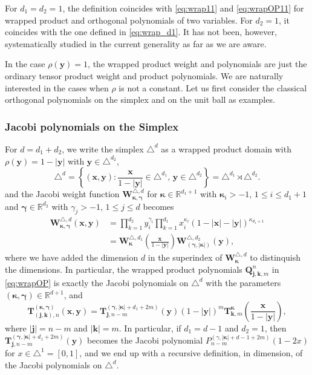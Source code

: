\documentclass{amsart}
\theoremstyle{remark}
\def\g{{\gamma}}
\def\k{{\kappa}}
\def\jb{{\bm j}}
\def\kb{{\bm k}}
\def\xb{{\bm x}}
\def\yb{{\bm y}}
\def\Qb{{\bm Q}}
\def\Tb{{\bm T}}
\def\Wb{{\bm W}}
\def\RR{{\mathbb R}}
\def\bg{{\boldsymbol{\gamma}}}
\def\bk{{\boldsymbol{\kappa}}}
\begin{document}
For $d_1 = d_2 = 1$, the definition coincides with \eqref{eq:wrap11} and \eqref{eq:wrapOP11} for wrapped product
and orthogonal polynomials of two variables. For $d_2 =1$, it coincides with the one defined in \eqref{eq:wrap_d1}. 
It has not been, however, systematically studied in the current generality as far as we are aware. 

In the case $\rho(\yb) = 1$, the wrapped product weight and polynomials are just the ordinary tensor product 
weight and product polynomials. We are naturally interested in the cases when $\rho$ is not a constant. 
Let us first consider the classical orthogonal polynomials on the simplex and on the unit ball as examples. 

\subsubsection{Jacobi polynomials on the Simplex} For $d = d_1+d_2$, we write the simplex $\triangle^{d}$ as a wrapped product 
domain with $\rho(\yb) = 1- |\yb|$ with $\yb \in \triangle^{d_2}$, 
$$
   \triangle^{d} = \left\{(\xb,\yb):   \frac{\xb}{1-|\yb|} \in \triangle^{d_1}, \, \yb \in \triangle^{d_2} \right\} 
      = \triangle^{d_1} \rtimes \triangle^{d_2}.
$$
and the Jacobi weight function $\Wb_{\bk, \bg}^{\triangle, d}$ for $\bk \in \RR^{d_1+1}$ with $\bk_i > -1$, $1 \le i \le d_1+1$
and $\bg \in \RR^{d_2}$ with $\g_j > -1$, $1 \le j \le d$ becomes 
\begin{align*}
  \Wb_{\bk, \bg}^{\triangle,d}(\xb, \yb) & =   \prod_{k=1}^{d_2} y_i^{\g_i} \prod_{k=1}^{d_1} x_i^{\k_i}(1-|\xb|-|\yb|)^{\k_{d_1+1}}  \\
    & = \Wb_\bk^{\triangle, d_1} \left(\frac{\xb}{1-|\yb|}\right) \Wb_{(\bg, |\bk|)}^{\triangle, d_2}(\yb),
\end{align*}
where we have added the dimension $d$ in the superindex of $\Wb_{\bk}^{\triangle, d}$ to distinquish the dimensions. 
In particular, the wrapped product polynomials $\Qb_{\jb,\kb,m}^n$ in \eqref{eq:wrapOP} is exactly the Jacobi polynomials
on $\triangle^d$ with the parameters $(\bk,\bg) \in \RR^{d+1}$, and 
$$
  \Tb_{(\jb,\kb),n}^{(\bk,\bg)} (\xb, \yb) = \Tb_{\jb, n-m}^{(\bg,  |\bk|+d_1+2m)}(\yb) (1-|\yb|)^m
     \Tb_{\kb,m}^{\bk}\left(\frac{\xb}{1-|\yb|}\right),
$$
where $|\jb| = n-m$ and $|\kb| = m$. In particular, if $d_1 = d-1$ and $d_2 = 1$, then 
$\Tb_{\jb, n-m}^{(\bg, |\bk|+d_1+2m)}(\yb)$ becomes the Jacobi polynomial 
$P_{n-m}^{(\g, |\bk|+d-1+2m)}(1- 2x)$ for $x \in  \triangle^1 = [0,1]$, and we end up with a recursive definition,
in dimension, of the Jacobi polynomials on $\triangle^d$. 
 
\end{document}
